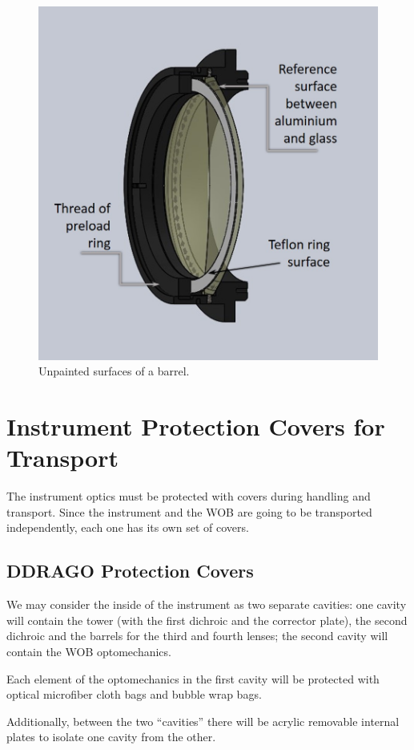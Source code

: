 \documentclass{report}
\begin{document}
\begin{figure}
\centering
\includegraphics[width=0.8\linewidth]{figures/unpainted-surfaces.jpg}
\caption{Unpainted surfaces of a barrel.}
\label{figure:unpainted-surf}
\end{figure}



\clearpage
\chapter{Instrument Protection Covers for Transport}

The instrument optics must be protected with covers during handling and transport.
Since the instrument and the WOB are going to be transported independently, each one has its own set of covers.

\section{DDRAGO Protection Covers}

We may consider the inside of the instrument as two separate cavities: one cavity will contain the tower (with the first dichroic and the corrector plate), the second dichroic and the barrels for the third and fourth lenses; the second cavity will contain the WOB optomechanics.

Each element of the optomechanics in the first cavity will be protected with optical microfiber cloth bags and bubble wrap bags.

Additionally, between the two “cavities” there will be acrylic removable internal plates to isolate one cavity from the other.
\end{document}
